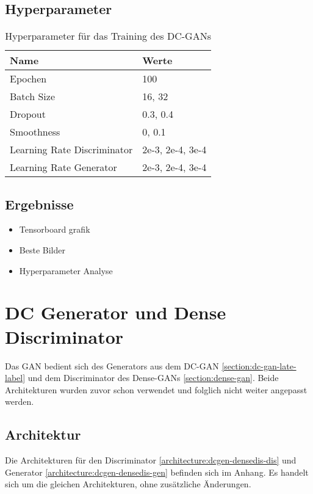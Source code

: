 \subsection{Hyperparameter}
\begin{table}[H]
	\centering
	\begin{tabular}{l l}
		Name                        & Werte            \\ \hline
		Epochen                     & 100              \\
		Batch Size                  & 16, 32           \\
		Dropout                     & 0.3, 0.4         \\
		Smoothness                  & 0, 0.1           \\
		Learning Rate Discriminator & 2e-3, 2e-4, 3e-4 \\
		Learning Rate Generator     & 2e-3, 2e-4, 3e-4
	\end{tabular}
	\caption{Hyperparameter für das Training des DC-GANs}
\end{table}

\subsection{Ergebnisse}
\begin{itemize}
	\item Tensorboard grafik
	\item Beste Bilder
	\item Hyperparameter Analyse
\end{itemize}

\section{DC Generator und Dense Discriminator}
Das GAN bedient sich des Generators aus dem DC-GAN \cref{section:dc-gan-late-label} und dem Discriminator des Dense-GANs \cref{section:dense-gan}.
Beide Architekturen wurden zuvor schon verwendet und folglich nicht weiter angepasst werden.

\subsection{Architektur}
Die Architekturen für den Discriminator \cref{architecture:dcgen-densedis-dis} und Generator \cref{architecture:dcgen-densedis-gen} befinden sich im Anhang.
Es handelt sich um die gleichen Architekturen, ohne zusätzliche Änderungen.

